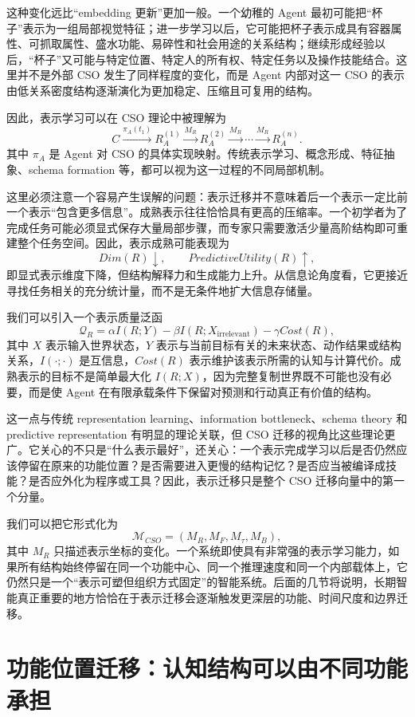 这种变化远比“embedding 更新”更加一般。一个幼稚的 Agent 最初可能把“杯子”表示为一组局部视觉特征；进一步学习以后，它可能把杯子表示成具有容器属性、可抓取属性、盛水功能、易碎性和社会用途的关系结构；继续形成经验以后，“杯子”又可能与特定位置、特定人的所有权、特定任务以及操作技能结合。这里并不是外部 CSO 发生了同样程度的变化，而是 Agent 内部对这一 CSO 的表示由低关系密度结构逐渐演化为更加稳定、压缩且可复用的结构。

因此，表示学习可以在 CSO 理论中被理解为
\[
C
\xrightarrow{\pi_A(t_1)}
R_A^{(1)}
\xrightarrow{M_R}
R_A^{(2)}
\xrightarrow{M_R}
\cdots
\xrightarrow{M_R}
R_A^{(n)}.
\]
其中 $\pi_A$ 是 Agent 对 CSO 的具体实现映射。传统表示学习、概念形成、特征抽象、schema formation 等，都可以视为这一过程的不同局部机制。

这里必须注意一个容易产生误解的问题：表示迁移并不意味着后一个表示一定比前一个表示“包含更多信息”。成熟表示往往恰恰具有更高的压缩率。一个初学者为了完成任务可能必须显式保存大量局部步骤，而专家只需要激活少量高阶结构即可重建整个任务空间。因此，表示成熟可能表现为
\[
Dim(R)\downarrow,
\qquad
PredictiveUtility(R)\uparrow,
\]
即显式表示维度下降，但结构解释力和生成能力上升。从信息论角度看，它更接近寻找任务相关的充分统计量，而不是无条件地扩大信息存储量。

我们可以引入一个表示质量泛函
\[
\mathcal Q_R
=
\alpha I(R;Y)
-
\beta I(R;X_{\mathrm{irrelevant}})
-
\gamma Cost(R),
\]
其中 $X$ 表示输入世界状态，$Y$ 表示与当前目标有关的未来状态、动作结果或结构关系，$I(\cdot;\cdot)$ 是互信息，$Cost(R)$ 表示维护该表示所需的认知与计算代价。成熟表示的目标不是简单最大化 $I(R;X)$，因为完整复制世界既不可能也没有必要，而是使 Agent 在有限承载条件下保留对预测和行动真正有价值的结构。

这一点与传统 representation learning、information bottleneck、schema theory 和 predictive representation 有明显的理论关联，但 CSO 迁移的视角比这些理论更广。它关心的不只是“什么表示最好”，还关心：一个表示完成学习以后是否仍然应该停留在原来的功能位置？是否需要进入更慢的结构记忆？是否应当被编译成技能？是否应外化为程序或工具？因此，表示迁移只是整个 CSO 迁移向量中的第一个分量。

我们可以把它形式化为
\[
\mathcal M_{CSO}
=
\left(
M_R,
M_F,
M_\tau,
M_B
\right),
\]
其中 $M_R$ 只描述表示坐标的变化。一个系统即使具有非常强的表示学习能力，如果所有结构始终停留在同一个功能中心、同一个推理速度和同一个内部载体上，它仍然只是一个“表示可塑但组织方式固定”的智能系统。后面的几节将说明，长期智能真正重要的地方恰恰在于表示迁移会逐渐触发更深层的功能、时间尺度和边界迁移。


\section{功能位置迁移：认知结构可以由不同功能承担}

